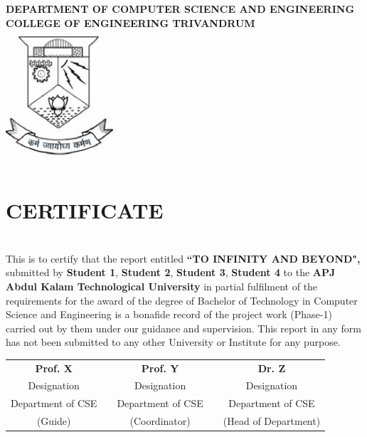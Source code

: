 \begin{center}

\bf{\Large {DEPARTMENT OF COMPUTER SCIENCE AND ENGINEERING}
}\\[0.2cm]
\normalsize
\textsc{\Large{COLLEGE OF ENGINEERING  TRIVANDRUM}}\\[0.9cm]

    \includegraphics[width = 40mm]{cet_emblem.eps}

\end{center}
\section*{\centering CERTIFICATE}
\linespread{1}

\noindent \\This is to certify that the report entitled \textbf{``TO INFINITY AND BEYOND",} submitted by \textbf{Student 1}, \textbf{Student 2}, \textbf{Student 3}, \textbf{Student 4} to the \textbf{APJ Abdul Kalam Technological University} in partial fulfilment of the requirements for the award of the degree of Bachelor of  Technology in Computer Science and Engineering is a bonafide record of the project work (Phase-1) carried out by them under our guidance and supervision. This report in any form has not been submitted to any other University or Institute for any purpose.

\vspace{2cm}

\begin{center}
\begin{tabular}{c c c c c} 
\centering
 \textbf{Prof. X}     && \textbf{Prof. Y}    && \textbf{Dr. Z} \\ 
    Designation        &&  Designation      && Designation \\ 
    Department of CSE          &&  Department of CSE        && Department of CSE \\
    (Guide)            &&  (Coordinator)    && (Head of Department) \\


\end{tabular}
\end{center}
\thispagestyle{empty}
\newpage
